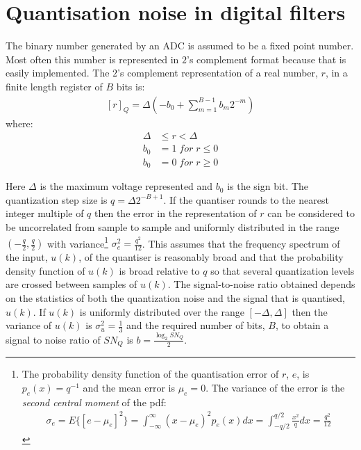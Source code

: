 \documentclass[a4paper,twoside,10pt,english]{report}
\begin{document}
\section{\label{Quantisation-noise-in-digital-filters}Quantisation noise in digital filters}
The binary number generated by an ADC is assumed to be a fixed
point number. Most often this number is represented in $2$'s complement
format because that is easily implemented. The $2$'s complement representation
of a real number, $r$, in a finite length register of $B$ bits is:
\begin{align*}
\left[r\right]_{Q}=\Delta \left(-b_{0}+\sum_{m=1}^{B-1}{b_{m}2^{-m}}\right)
\end{align*}
where:
\begin{align*}
\Delta  &\le r <\Delta\\
b_{0}&=1\; for\; r \le 0\\
b_{0}&=0\; for\; r \ge 0
\end{align*}

Here $\Delta$ is the maximum voltage represented and $b_{0}$ is the sign bit. 
The quantization step size is $q=\Delta 2^{-B+1}$. If the quantiser rounds to 
the nearest integer multiple of $q$ then the error in the representation of
$r$ can be considered to be uncorrelated from sample to sample and uniformly
distributed in the range $\left(-\frac{q}{2},\frac{q}{2}\right)$ with 
variance\footnote{The probability density function of 
the quantisation error of $r$, $e$, is $p_{e}\left(x\right)=q^{-1}$ and the 
mean error is $\mu_{e}=0$. The variance of the error is the \emph{second
central moment} of the pdf:
\begin{align*}
\sigma_{e}=E\{\left[ e-\mu_{e}\right] ^{2}\}
=\int_{-\infty}^{\infty}\left( x-\mu_{e}\right)^{2}p_{e}\left(x\right)\mathit{dx}
=\int_{-q/2}^{q/2}{\frac{x^{2}}{q}}\mathit{dx}=\frac{q^{2}}{12}
\end{align*}} $\sigma_{e}^{2}=\frac{q^{2}}{12}$.
This assumes that the frequency spectrum of the input, $u\left(k\right)$, of 
the quantiser is reasonably broad and that the probability density function of
$u\left(k\right)$ is broad relative to $q$ so that several quantization levels 
are crossed between samples of $u\left(k\right)$. The signal-to-noise ratio 
obtained depends on the statistics of both the quantization noise and the 
signal that is quantised, $u\left(k\right)$. If $u\left(k\right)$ is uniformly 
distributed over the range $\left[-\Delta,\Delta\right]$ then the variance of
$u\left(k\right)$ is $\sigma_{u}^{2}=\frac{1}{3}$ and the required number of 
bits, $B$, to obtain a signal to noise ratio of $SN_{Q}$ is 
$b=\frac{\log_{2}SN_{Q}}{2}$.
\end{document}
